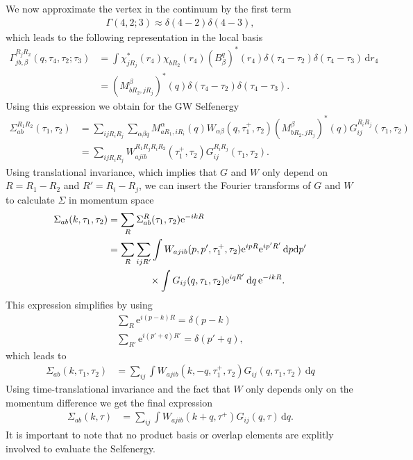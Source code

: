 \documentclass[12pt,a4paper]{scrartcl}
\numberwithin{equation}{section}
\begin{document}
We now approximate the vertex in the continuum by the first term
\begin{align}
 \Gamma(4,2;3) \approx \delta(4-2)\delta(4-3) , 
\end{align}
 which leads to the following representation in
 the local basis
\begin{align}
\Gamma^{R_jR_2}_{jb,\beta}(q,\tau_4,\tau_2;\tau_3)
&= \int \chi^*_{jR_j}(r_4) \chi_{bR_2}(r_4)  (B^q_{\beta})^*(r_4)
    \delta(\tau_4-\tau_2)\delta(\tau_4-\tau_3)\, \mathrm{d}r_4 \\
%
&= \left( M^{\beta}_{bR_2,jR_j} \right)^*(q)  \delta(\tau_4-\tau_2)\delta(\tau_4-\tau_3).
\end{align}
Using this expression we obtain for the GW Selfenergy
\begin{align}
 \Sigma^{R_1R_2}_{ab}(\tau_1,\tau_2)
%
&= \sum_{ijR_iR_j}\sum_{\alpha\beta q}
   M^{\alpha}_{aR_1,iR_i}(q) W_{\alpha\beta}(q,\tau_1^+,\tau_2) \left( M^{\beta}_{bR_2,jR_j} \right)^*(q)  
   G^{R_iR_j}_{ij}(\tau_1,\tau_2)  \\
&= \sum_{ijR_iR_j} W^{R_1R_jR_iR_2}_{ajib}(\tau_1^+,\tau_2)  G^{R_iR_j}_{ij}(\tau_1,\tau_2) .
\end{align}
Using translational invariance, which implies that $G$ and $W$ only
depend on $R=R_1-R_2$ and $R'=R_i-R_j$, we can insert the 
Fourier transforms of $G$ and $W$ to 
calculate $\Sigma$ in momentum space
\begin{align}
 \Sigma_{ab}(k,\tau_1,\tau_2)
 &= \sum_{R} \Sigma^{R}_{ab}(\tau_1,\tau_2) \mathrm{e}^{-ikR}\\
% 
&= \sum_{R} \sum_{ijR'} \int W_{ajib}(p,p',\tau_1^+,\tau_2)
    \mathrm{e}^{ipR}\mathrm{e}^{ip'R'} \,\mathrm{d}p\mathrm{d}p'  \nonumber\\
& \hspace{1.5cm}   \times\int G_{ij}(q, \tau_1,\tau_2) \mathrm{e}^{iqR'} \, \mathrm{d}q
   \, \mathrm{e}^{-ikR}.
\end{align}
This expression simplifies by using
\begin{align}
 \sum_R \mathrm{e}^{i( p -k  )R} = \delta(p-k) \\
 \sum_{R'} \mathrm{e}^{i( p' + q  )R'} = \delta(p' + q) ,
\end{align}
which leads to
\begin{align}
 \Sigma_{ab}(k,\tau_1,\tau_2)
% 
&=  \sum_{ij} \int W_{ajib}(k,-q,\tau_1^+,\tau_2)
     G_{ij}(q, \tau_1,\tau_2)  \, \mathrm{d}q
\end{align}
Using time-translational invariance and the fact
that $W$ only depends only on the momentum difference we get the final
expression
 \begin{align}
 \Sigma_{ab}(k,\tau)
% 
&=  \sum_{ij} \int W_{ajib}(k+q,\tau^+)
     G_{ij}(q, \tau)  \, \mathrm{d}q . 
\end{align}
It is important to note that no product basis or overlap elements are explitly involved 
to evaluate the Selfenergy.
\end{document}
